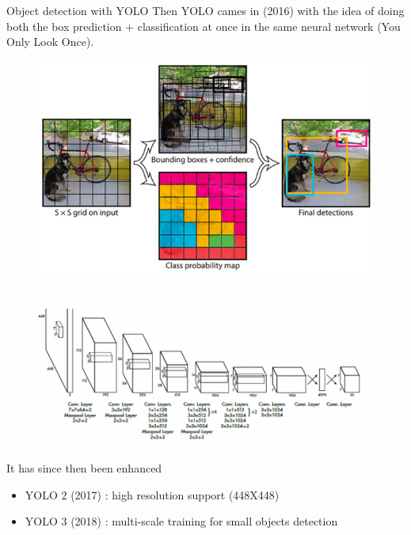 \documentclass[tikz,table,border=2mm]{beamer}
\begin{document}
\begin{frame}{Object detection with YOLO}
Then YOLO cames in (2016) with the idea of doing both the box prediction + classification at once in the same neural network (You Only Look Once).
\begin{figure}[ht]
        \begin{minipage}[b]{0.35\linewidth}
            \centering
            \includegraphics[width=\textwidth]{images/yolo_1.jpg}
            \label{fig:a}
        \end{minipage}
        \hspace{0.5cm}
        \begin{minipage}[b]{0.35\linewidth}
            \centering
            \includegraphics[width=\textwidth]{images/yolo_2.png}
            \label{fig:b}
        \end{minipage}
\end{figure}


It has since then been enhanced
\begin{itemize}
 \item YOLO 2 (2017) : high resolution support (448X448)
 \item YOLO 3 (2018) : multi-scale training for small objects detection
\end{itemize}
\end{frame}
\end{document}
